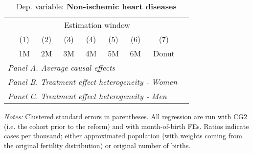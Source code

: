  \begin{table}[H] \begin{threeparttable} \centering \caption{Dep. variable: \textbf{Non-ischemic heart diseases}} {\def\sym#1{\ifmmode^{#1}\else\(^{#1}\)\fi} \begin{tabular}{l*{8}{c}} \toprule & \multicolumn{7}{c}{Estimation window} \\ \cmidrule(lr){2-8}
            &\multicolumn{1}{c}{(1)}&\multicolumn{1}{c}{(2)}&\multicolumn{1}{c}{(3)}&\multicolumn{1}{c}{(4)}&\multicolumn{1}{c}{(5)}&\multicolumn{1}{c}{(6)}&\multicolumn{1}{c}{(7)}\\
            &\multicolumn{1}{c}{1M}&\multicolumn{1}{c}{2M}&\multicolumn{1}{c}{3M}&\multicolumn{1}{c}{4M}&\multicolumn{1}{c}{5M}&\multicolumn{1}{c}{6M}&\multicolumn{1}{c}{Donut}\\
\midrule
 \multicolumn{8}{l}{\emph{Panel A. Average causal effects}} \\       \midrule\multicolumn{8}{l}{\emph{Panel B. Treatment effect heterogeneity - Women}} \\       \midrule\multicolumn{8}{l}{\emph{Panel C. Treatment effect heterogeneity - Men}} \\       
\bottomrule \end{tabular} } \begin{tablenotes} \item \scriptsize \emph{Notes:} Clustered standard errors in parentheses. All regression are run with CG2 (i.e. the cohort prior to the reform) and with month-of-birth FEs. Ratios indicate cases per thousand; either approximated population (with weights coming from the original fertility distribution) or original number of births. \end{tablenotes} \end{threeparttable} \end{table} 
